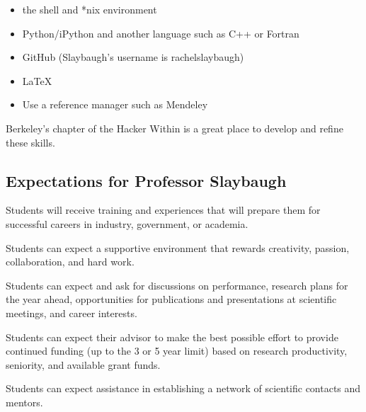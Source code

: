 \documentclass[12pt,twoside]{article}
\begin{document}
\begin{itemize}
\item the shell and *nix environment
\item Python/iPython and another language such as C++ or Fortran
\item GitHub (Slaybaugh's username is rachelslaybaugh)
\item \LaTeX
\item Use a reference manager such as Mendeley
\end{itemize}

Berkeley's chapter of the Hacker Within is a great place to develop and refine these skills.

\begin{center}
\section*{Expectations for Professor Slaybaugh}
\end{center}

Students will receive training and experiences that will prepare them for successful careers in industry, government, or academia.

Students can expect a supportive environment that rewards creativity, passion, collaboration, and hard work.

Students can expect and ask for discussions on performance, research plans for the year ahead, opportunities for publications and presentations at scientific meetings, and career interests.

Students can expect their advisor to make the best possible effort to provide continued funding (up to the 3 or 5 year limit) based on research productivity, seniority, and available grant funds.

Students can expect assistance in establishing a network of scientific contacts and mentors.
\end{document}
